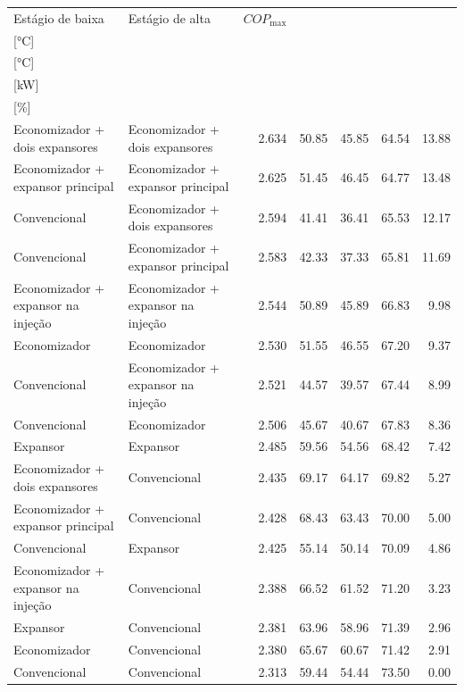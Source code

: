 {\small\setlength{\tabcolsep}{4pt}\renewcommand{\arraystretch}{1.12}
\begin{tabular}{llrrrrr}
\toprule
Estágio de baixa & Estágio de alta & $COP_{\max}$ & \shortstack{$T_{\mathrm{cond,l}}^*$\\{[°C]}} & \shortstack{$T_{\mathrm{evap,h}}^*$\\{[°C]}} & \shortstack{$\dot W_{\mathrm{liq}}$\\{[kW]}} & \shortstack{$\Delta COP_{\mathrm{opt}}$\\{[\%]}} \\
\midrule
Economizador + dois expansores & Economizador + dois expansores & 2.634 & 50.85 & 45.85 & 64.54 & 13.88 \\
Economizador + expansor principal & Economizador + expansor principal & 2.625 & 51.45 & 46.45 & 64.77 & 13.48 \\
Convencional & Economizador + dois expansores & 2.594 & 41.41 & 36.41 & 65.53 & 12.17 \\
Convencional & Economizador + expansor principal & 2.583 & 42.33 & 37.33 & 65.81 & 11.69 \\
Economizador + expansor na injeção & Economizador + expansor na injeção & 2.544 & 50.89 & 45.89 & 66.83 & 9.98 \\
Economizador & Economizador & 2.530 & 51.55 & 46.55 & 67.20 & 9.37 \\
Convencional & Economizador + expansor na injeção & 2.521 & 44.57 & 39.57 & 67.44 & 8.99 \\
Convencional & Economizador & 2.506 & 45.67 & 40.67 & 67.83 & 8.36 \\
Expansor & Expansor & 2.485 & 59.56 & 54.56 & 68.42 & 7.42 \\
Economizador + dois expansores & Convencional & 2.435 & 69.17 & 64.17 & 69.82 & 5.27 \\
Economizador + expansor principal & Convencional & 2.428 & 68.43 & 63.43 & 70.00 & 5.00 \\
Convencional & Expansor & 2.425 & 55.14 & 50.14 & 70.09 & 4.86 \\
Economizador + expansor na injeção & Convencional & 2.388 & 66.52 & 61.52 & 71.20 & 3.23 \\
Expansor & Convencional & 2.381 & 63.96 & 58.96 & 71.39 & 2.96 \\
Economizador & Convencional & 2.380 & 65.67 & 60.67 & 71.42 & 2.91 \\
Convencional & Convencional & 2.313 & 59.44 & 54.44 & 73.50 & 0.00 \\
\bottomrule
\end{tabular}
}
